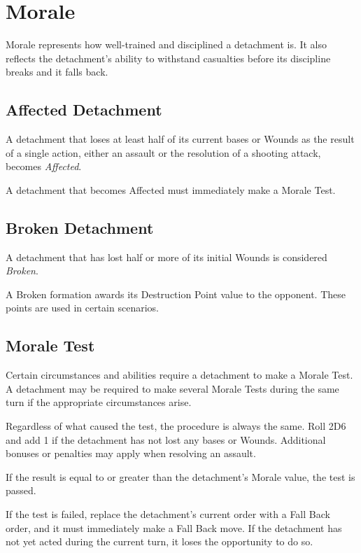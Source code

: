 \section{Morale}

Morale represents how well-trained and disciplined a detachment is. It also reflects the detachment's ability to withstand casualties before its discipline breaks and it falls back.

\subsection{Affected Detachment}

A detachment that loses at least half of its current bases or Wounds as the result of a single action, either an assault or the resolution of a shooting attack, becomes \textit{Affected}.

A detachment that becomes Affected must immediately make a Morale Test.

\subsection{Broken Detachment}

A detachment that has lost half or more of its initial Wounds is considered \textit{Broken}.

A Broken formation awards its Destruction Point value to the opponent. These points are used in certain scenarios.

\subsection{Morale Test}

Certain circumstances and abilities require a detachment to make a Morale Test. A detachment may be required to make several Morale Tests during the same turn if the appropriate circumstances arise.

Regardless of what caused the test, the procedure is always the same. Roll 2D6 and add 1 if the detachment has not lost any bases or Wounds. Additional bonuses or penalties may apply when resolving an assault.

If the result is equal to or greater than the detachment's Morale value, the test is passed.

If the test is failed, replace the detachment's current order with a Fall Back order, and it must immediately make a Fall Back move. If the detachment has not yet acted during the current turn, it loses the opportunity to do so.

